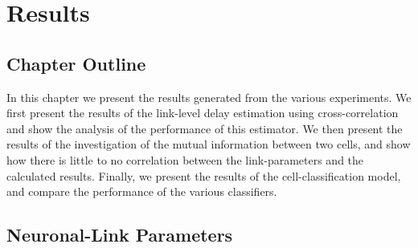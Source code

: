 \chapter{Results}
\label{chap:res}
\section*{Chapter Outline}
In this chapter we present the results generated from the various experiments. We first present the results of the link-level delay estimation using cross-correlation and show the analysis of the performance of this estimator. We then present the results of the investigation of the mutual information between two cells, and show how there is little to no correlation between the link-parameters and the calculated results. Finally, we present the results of the cell-classification model, and compare the performance of the various classifiers.


\section{Neuronal-Link Parameters}


